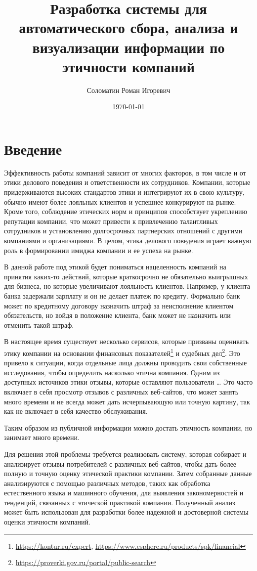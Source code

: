 \documentclass[PI, VKR]{HSEUniversity}
\author{Соломатин Роман Игоревич}
\date{\today}
\title{Разработка системы для автоматического сбора, анализа и визуализации информации по этичности компаний}
\begin{document}
\maketitle

\chapter*{Введение}
\label{sec:org16d9294}
Эффективность работы компаний зависит от многих факторов, в том числе и от этики делового поведения и ответственности их сотрудников. Компании, которые придерживаются высоких стандартов этики и интегрируют их в свою культуру, обычно имеют более лояльных клиентов и успешнее конкурируют на рынке. Кроме того, соблюдение этических норм и принципов способствует укреплению репутации компании, что может привести к привлечению талантливых сотрудников и установлению долгосрочных партнерских отношений с другими компаниями и организациями. В целом, этика делового поведения играет важную роль в формировании имиджа компании и ее успеха на рынке.

В данной работе под этикой будет пониматься нацеленность компаний на принятия каких-то действий, которые краткосрочно не обязательно выигрышных для бизнеса, но которые увеличивают лояльность клиентов. Например, у клиента банка задержали зарплату и он не делает платеж по кредиту. Формально банк может по кредитному договору назначить штраф за неисполнение клиентом обязательств, но войдя в положение клиента, банк может не назначить или отменить такой штраф.

В настоящее время существует несколько сервисов, которые призваны оценивать этику компании на основании финансовых показателей\footnote{\url{https://kontur.ru/expert}, \url{https://www.esphere.ru/products/spk/financial}} и судебных дел\footnote{\url{https://proverki.gov.ru/portal/public-search}}. Это привело к ситуации, когда отдельные лица должны проводить свои собственные исследования, чтобы определить насколько этична компания. Одним из доступных источнков этики отзывы, которые оставляют пользователи \ldots{} Это часто включает в себя просмотр отзывов с различных веб-сайтов, что может занять много времени и не всегда может дать исчерпывающую или точную картину, так как не включает в себя качество обслуживания.

Таким образом из публичной информации можно достать этичность компании, но занимает много времени.

Для решения этой проблемы требуется реализовать систему, которая собирает и анализирует отзывы потребителей с различных веб-сайтов, чтобы дать более полную и точную оценку этической практики компании. Затем собранные данные анализируются с помощью различных методов, таких как обработка естественного языка и машинного обучения, для выявления закономерностей и тенденций, связанных с этической практикой компании. Полученный анализ может быть использован для разработки более надежной и достоверной системы оценки этичности компаний.
\end{document}
